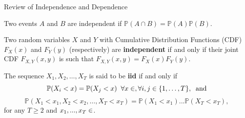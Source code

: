 \documentclass[envcountsect,usenames,dvipsnames]{beamer}
\theoremstyle{mystyle}
\begin{document}
\begin{frame}{Review of Independence and Dependence}
		\small
		\begin{Definition}
		   Two events $A$ and $B$ are independent if 
		       $\mathbb{P}(A \cap B) = \mathbb{P}(A)\mathbb{P}(B)$.
		\end{Definition}
		
		\begin{Definition}
		  Two random variables $X$ and $Y$ with Cumulative Distribution Functions (CDF) $F_X(x)$ and $F_Y(y)$ (respectively) are {\color{beamer@UIUCblue} \textbf{independent}} if and only if their joint CDF $F_{X,Y}(x,y)$ is such that $
		      F_{X,Y}(x,y) = F_{X}(x) F_{Y}(y)$.
		\end{Definition}
		
		\begin{Definition}
		The sequence $X_{1},X_{2},\hdots,X_{T}$ is said to be {\color{beamer@UIUCblue} \textbf{iid}} if and only if
		\begin{equation*}
		    \mathbb{P}(X_{i}<x) = \mathbb{P}(X_{j}<x) \;\; \forall x \in \real, \forall i,j \in \{1,\ldots,T\},  \;\; \text{and}
		\end{equation*}
		\begin{equation*}
		    \mathbb{P}(X_{1}<x_{1},X_{2}<x_{2},\hdots,X_{T}<x_{T})=\mathbb{P}(X_{1}<x_1)...\mathbb{P}(X_{T}<x_T), 
		\end{equation*}
		for any $T\geq2$ and $x_1, ..., x_T \in \real$.
		\end{Definition}
		

\end{frame}


\end{document}
